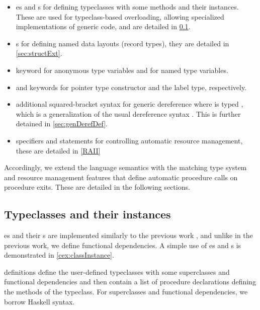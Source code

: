 \begin{itemize}
    \item {}es and s for defining typeclasses with some methods and their instances. These are used for typeclass-based overloading, allowing specialized implementations of generic code, and are detailed in \cref{sec:tyClassInst}.

    \item {}s for defining named data layouts (record types), they are detailed in \cref{sec:structExt}.

    \item {} keyword for anonymous type variables and  for named type variables.

    \item {} and  keywords for pointer type constructor and the label type, respectively.

    \item additional squared-bracket syntax for generic dereference \li{[address]} where  is typed , which is a generalization of the usual \cmm dereference syntax . This is further detained in \cref{sec:genDerefDef}.

    \item {} specifiers and  statements for controlling automatic resource management, these are detailed in \cref{RAII}
\end{itemize}

Accordingly, we extend the language semantics with the matching type system and resource management features that define automatic procedure calls on procedure exits. These are detailed in the following sections.

\subsection{Typeclasses and their instances}
\label{sec:tyClassInst}

es and their s are implemented similarly to the previous work \cite{klepl2020type}, and unlike in the previous work, we define functional dependencies. A simple use of es and s is demonstrated in \cref{cex:classInstance}.

 definitions define the user-defined typeclasses with some superclasses and functional dependencies and then contain a list of procedure declarations defining the methods of the typeclass. For superclasses and functional dependencies, we borrow Haskell syntax.

